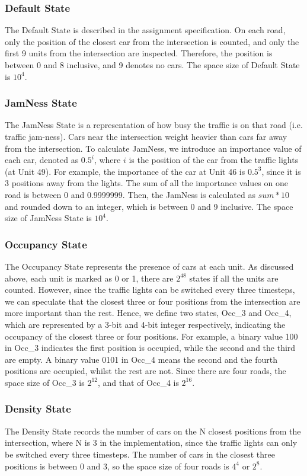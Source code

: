 \subsubsection{Default State}
The Default State is described in the assignment specification. On each road, only the position of the closest car from the intersection is counted, and only the first 9 units from the intersection are inspected. Therefore, the position is between 0 and 8 inclusive, and 9 denotes no cars. The space size of Default State is $10^4$.

\subsubsection{JamNess State}
The JamNess State is a representation of how busy the traffic is on that road (i.e. traffic jam-ness). Cars near the intersection weight heavier than cars far away from the intersection. To calculate JamNess, we introduce an importance value of each car, denoted as $0.5^i$, where $i$ is the position of the car from the traffic lights (at Unit 49). For example, the importance of the car at Unit 46 is $0.5^3$, since it is 3 positions away from the lights. The sum of all the importance values on one road is between 0 and 0.9999999. Then, the JamNess is calculated as $sum * 10$ and rounded down to an integer, which is between 0 and 9 inclusive. The space size of JamNess State is $10^4$.

\subsubsection{Occupancy State}
The Occupancy State represents the presence of cars at each unit. As discussed above, each unit is marked as 0 or 1, there are $2^{48}$ states if all the units are counted. However, since the traffic lights can be switched every three timesteps, we can speculate that the closest three or four positions from the intersection are more important than the rest. Hence, we define two states, Occ\_3 and Occ\_4, which are represented by a 3-bit and 4-bit integer respectively, indicating the occupancy of the closest three or four positions. For example, a binary value 100 in Occ\_3 indicates the first position is occupied, while the second and the third are empty. A binary value 0101 in Occ\_4 means the second and the fourth positions are occupied, whilst the rest are not. Since there are four roads, the space size of Occ\_3 is $2^{12}$, and that of Occ\_4 is $2^{16}$.

\subsubsection{Density State}
The Density State records the number of cars on the N closest positions from the intersection, where N is 3 in the implementation, since the traffic lights can only be switched every three timesteps. The number of cars in the closest three positions is between 0 and 3, so the space size of four roads is $4^4$ or $2^8$.

